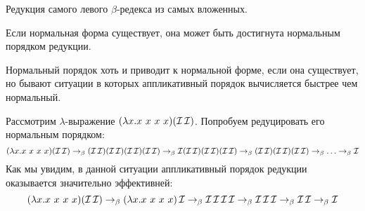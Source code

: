 \begin{definition}
	Редукция самого левого $\beta$-редекса из самых вложенных.
\end{definition}

\begin{theorem}
	Если нормальная форма существует, она может быть достигнута нормальным порядком редукции.
\end{theorem}

Нормальный порядок хоть и приводит к нормальной форме, если она существует, но бывают ситуации в которых аппликативный порядок вычисляется быстрее чем нормальный.

\begin{example}
	Рассмотрим $\lambda$-выражение $(\lambda{}x.x \ x \ x \ x) (\comb I \comb I)$. Попробуем редуцировать его нормальным порядком:
	 \[(\lambda{}x.x \ x \ x \ x) (\comb I \comb I) \to_{\beta} (\comb I \comb I)(\comb I \comb I)(\comb I \comb I)(\comb I \comb I) \to_{\beta} \comb I(\comb I \comb I)(\comb I \comb I)(\comb I \comb I) \to_{\beta} (\comb I \comb I)(\comb I \comb I)(\comb I \comb I) \to_{\beta} \ldots \to_{\beta} \comb I\] 
	Как мы увидим, в данной ситуации аппликативный порядок редукции оказывается значительно эффективней: 
	\[ (\lambda{}x.x \ x \ x \ x) (\comb I \comb I) \to_{\beta} (\lambda{}x.x \ x \ x \ x) \comb I \to_{\beta} \comb I \comb I \comb I \comb I\to_{\beta} \comb I \comb I \comb I \to_{\beta} \comb I \comb I \to_{\beta} \comb I \]
\end{example}
